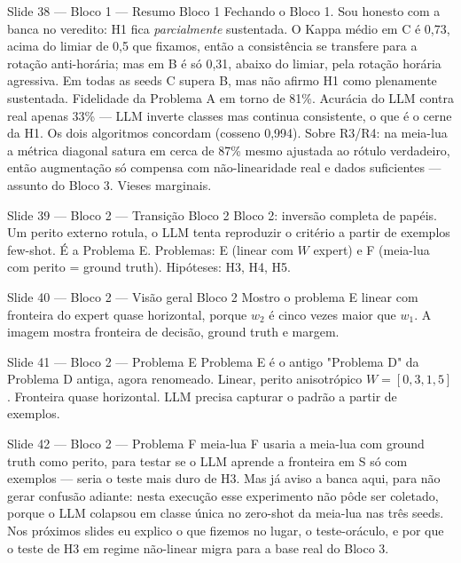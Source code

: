 \documentclass[aspectratio=169,10pt]{beamer}
\begin{document}
\begin{frame}{Slide 38 --- Bloco 1 --- Resumo Bloco 1}
\footnotesize
Fechando o Bloco 1. Sou honesto com a banca no veredito: H1 fica \emph{parcialmente} sustentada. O Kappa m\'edio em C \'e 0{,}73, acima do limiar de 0{,}5 que fixamos, ent\~ao a consist\^encia se transfere para a rota\c{c}\~ao anti-hor\'aria; mas em B \'e s\'o 0{,}31, abaixo do limiar, pela rota\c{c}\~ao hor\'aria agressiva. Em todas as seeds C supera B, mas n\~ao afirmo H1 como plenamente sustentada. Fidelidade da Problema A em torno de 81\%. Acur\'acia do LLM contra real apenas 33\% --- LLM inverte classes mas continua consistente, o que \'e o cerne da H1. Os dois algoritmos concordam (cosseno 0,994). Sobre R3/R4: na meia-lua a m\'etrica diagonal satura em cerca de 87\% mesmo ajustada ao r\'otulo verdadeiro, ent\~ao augmenta\c{c}\~ao s\'o compensa com n\~ao-linearidade real e dados suficientes --- assunto do Bloco 3. Vieses marginais.
\end{frame}

\begin{frame}{Slide 39 --- Bloco 2 --- Transi\c{c}\~ao Bloco 2}
\footnotesize
Bloco 2: invers\~ao completa de pap\'eis. Um perito externo rotula, o LLM tenta reproduzir o crit\'erio a partir de exemplos few-shot. \'E a Problema E. Problemas: E (linear com $W$ expert) e F (meia-lua com perito = ground truth). Hip\'oteses: H3, H4, H5.
\end{frame}

\begin{frame}{Slide 40 --- Bloco 2 --- Vis\~ao geral Bloco 2}
\footnotesize
Mostro o problema E linear com fronteira do expert quase horizontal, porque $w_2$ \'e cinco vezes maior que $w_1$. A imagem mostra fronteira de decis\~ao, ground truth e margem.
\end{frame}

\begin{frame}{Slide 41 --- Bloco 2 --- Problema E}
\footnotesize
Problema E \'e o antigo "Problema D" da Problema D antiga, agora renomeado. Linear, perito anisotr\'opico $W=[0{,}3, 1{,}5]$. Fronteira quase horizontal. LLM precisa capturar o padr\~ao a partir de exemplos.
\end{frame}

\begin{frame}{Slide 42 --- Bloco 2 --- Problema F meia-lua}
\footnotesize
F usaria a meia-lua com ground truth como perito, para testar se o LLM aprende a fronteira em S s\'o com exemplos --- seria o teste mais duro de H3. Mas j\'a aviso a banca aqui, para n\~ao gerar confus\~ao adiante: nesta execu\c{c}\~ao esse experimento n\~ao p\^ode ser coletado, porque o LLM colapsou em classe \'unica no zero-shot da meia-lua nas tr\^es seeds. Nos pr\'oximos slides eu explico o que fizemos no lugar, o teste-or\'aculo, e por que o teste de H3 em regime n\~ao-linear migra para a base real do Bloco 3.
\end{frame}
\end{document}
